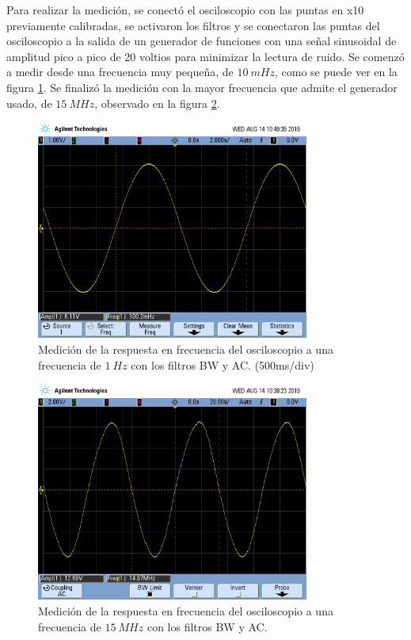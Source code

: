 \documentclass[a4paper]{article}
\begin{document}
Para realizar la medición, se conectó el osciloscopio con las puntas en x10 previamente calibradas, se activaron los filtros y se conectaron las puntas del osciloscopio a la salida de un generador de funciones con una señal sinusoidal de amplitud pico a pico de 20 voltios para minimizar la lectura de ruido. Se comenzó a medir desde una frecuencia muy pequeña, de $10 \ mHz$, como se puede ver en la figura \ref{graf:osci_freq_baja}. Se finalizó la medición con la mayor frecuencia que admite el generador usado, de $15 \ MHz$, observado en la figura \ref{graf:osci_freq_alta}.

\begin{figure}[H]
	\centering
	\includegraphics[width=0.8\textwidth,trim={0.5cm 2cm  0.5 5cm},clip]{osci100mhz.png}
	\caption{Medición de la respuesta en frecuencia del osciloscopio a una frecuencia de $1 \ Hz$ con los filtros BW y AC. (500ms/div)} 
	\label{graf:osci_freq_baja}
\end{figure}

\begin{figure}[H]
	\centering
	\includegraphics[width=0.8\textwidth,trim={0.5cm 2cm  0.5 5cm},clip]{osci15Mhz.png}
	\caption{Medición de la respuesta en frecuencia del osciloscopio a una frecuencia de $15 \ MHz$ con los filtros BW y AC.} 
	\label{graf:osci_freq_alta}
\end{figure}
\end{document}
